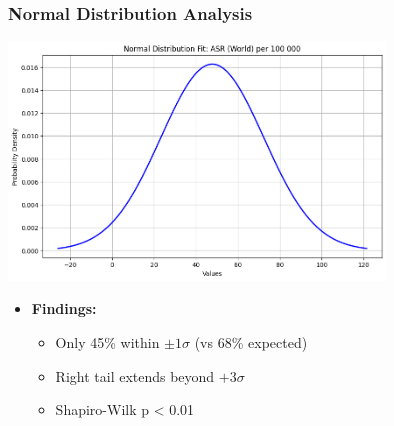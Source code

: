 \begin{frame}
    \frametitle{Normal Distribution Analysis}
    \centering
    \includegraphics[width=0.75\textwidth,height=0.6\textheight,keepaspectratio]{./images/graph/normaldist.png}
    \vspace{-0.5em}  %
    \begin{itemize}
        \item \textbf{Findings:}
        \begin{itemize}
            \item Only 45\% within $\pm1\sigma$ (vs 68\% expected)
            \item Right tail extends beyond $+3\sigma$
            \item Shapiro-Wilk p < 0.01
        \end{itemize}
    \end{itemize}
\end{frame}


